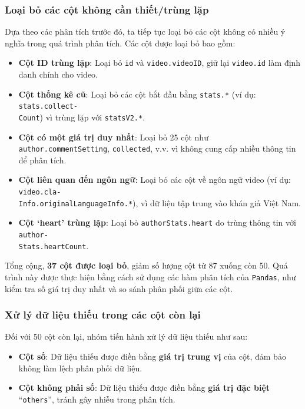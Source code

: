 \subsubsection{Loại bỏ các cột không cần thiết/trùng lặp}

Dựa theo các phân tích trước đó, ta tiếp tục loại bỏ các cột không có nhiều ý nghĩa trong quá trình phân tích. Các cột được loại bỏ bao gồm:
\begin{itemize}
    \item \textbf{Cột ID trùng lặp}: Loại bỏ \texttt{id} và \texttt{video.videoID}, giữ lại \texttt{video.id} làm định danh chính cho video.
    
    \item \textbf{Cột thống kê cũ}: Loại bỏ các cột bắt đầu bằng \texttt{stats.*} (ví dụ: \texttt{stats.collect-\\Count}) vì trùng lặp với \texttt{statsV2.*}.
    
    \item \textbf{Cột có một giá trị duy nhất}: Loại bỏ 25 cột như \texttt{author.commentSetting}, \texttt{collected}, v.v. vì không cung cấp nhiều thông tin để phân tích.
    
    \item \textbf{Cột liên quan đến ngôn ngữ}: Loại bỏ các cột về ngôn ngữ video (ví dụ: \texttt{video.cla-\\Info.originalLanguageInfo.*}), vì dữ liệu tập trung vào khán giả Việt Nam.
    
    \item \textbf{Cột `heart' trùng lặp}: Loại bỏ \texttt{authorStats.heart} do trùng thông tin với \texttt{author-\\Stats.heartCount}.
\end{itemize}

Tổng cộng, \textbf{37 cột được loại bỏ}, giảm số lượng cột từ 87 xuống còn 50. Quá trình này được thực hiện bằng cách sử dụng các hàm phân tích của \texttt{Pandas}, như kiểm tra số giá trị duy nhất và so sánh phân phối giữa các cột.

\subsubsection{Xử lý dữ liệu thiếu trong các cột còn lại}

Đối với 50 cột còn lại, nhóm tiến hành xử lý dữ liệu thiếu như sau:
\begin{itemize}
    \item \textbf{Cột số}: Dữ liệu thiếu được điền bằng \textbf{giá trị trung vị} của cột, đảm bảo không làm lệch phân phối dữ liệu.
    \item \textbf{Cột không phải số}: Dữ liệu thiếu được điền bằng \textbf{giá trị đặc biệt} ``\texttt{others}'', tránh gây nhiễu trong phân tích.
\end{itemize}

